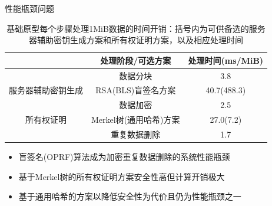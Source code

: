 \documentclass{beamer}
\begin{document}
\begin{frame}{性能瓶颈问题}
    \begin{table}[!htb]
        \small
        \centering
        \caption{基础原型每个步骤处理1MiB数据的时间开销：括号内为可供备选的服务器辅助密钥生成方案和所有权证明方案，以及相应处理时间}
        \label{tab:intro-bottleneck}
        \begin{tabular}{@{}ccc@{}}
            \toprule
                                        & 处理阶段/可选方案                    & 处理时间(ms/MiB)          \\ \midrule
                                        & 数据分块                             & 3.8                       \\
            服务器辅助密钥生成          & {\color{red} RSA(BLS)盲签名方案}     & {\color{red} 40.7(488.3)} \\
            \multirow{3}{*}{所有权证明} & 数据加密                             & 2.5                       \\
                                        & {\color{red} Merkel树(通用哈希)方案} & {\color{red} 27.0(7.2)}   \\
                                        & 重复数据删除                         & 1.7                       \\ \bottomrule
        \end{tabular}
    \end{table}
    \begin{itemize}
        \item 盲签名(OPRF)算法成为加密重复数据删除的系统性能瓶颈
        \item 基于Merkel树的所有权证明方案安全性高但计算开销极大
        \item 基于通用哈希的方案以降低安全性为代价且仍为性能瓶颈之一
    \end{itemize}
\end{frame}
\end{document}
